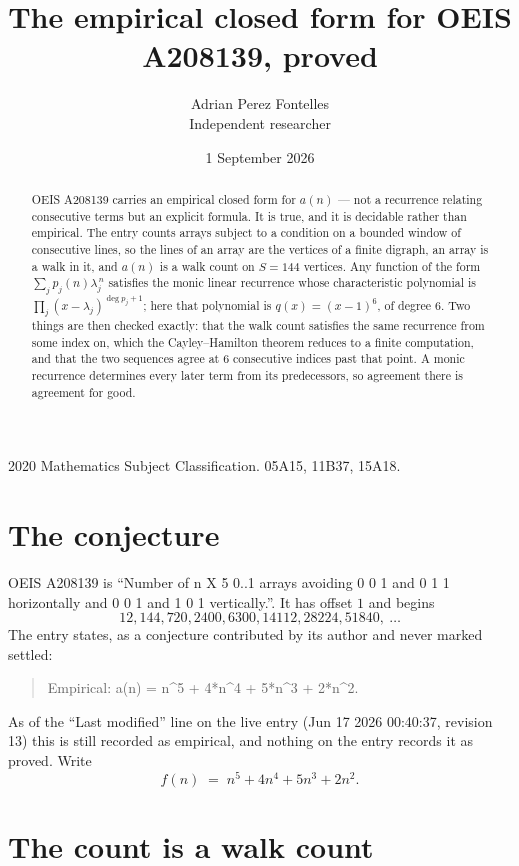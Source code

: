 \documentclass[11pt,a4paper]{article}
\title{The empirical closed form for OEIS A208139, proved}
\author{Adrian Perez Fontelles\\ \small Independent researcher}
\date{1 September 2026}
\theoremstyle{plain}
\theoremstyle{definition}
\begin{document}
\maketitle

\begin{abstract}
OEIS A208139 carries an empirical closed form for $a(n)$ --- not a recurrence relating
consecutive terms but an explicit formula. It is true, and it is decidable rather than
empirical. The entry counts arrays subject to a condition on a bounded window of consecutive lines, so the lines of an array are the
vertices of a finite digraph, an array is a walk in it, and $a(n)$ is a walk count on
$S=144$ vertices. Any function of the form $\sum_j p_j(n)\lambda_j^{\,n}$ satisfies the
monic linear recurrence whose characteristic polynomial is
$\prod_j(x-\lambda_j)^{\deg p_j+1}$; here that polynomial is $q(x)=(x-1)^{6}$, of degree
$6$. Two things are then checked exactly: that the walk count satisfies the same
recurrence from some index on, which the Cayley--Hamilton theorem reduces to a finite
computation, and that the two sequences agree at $6$ consecutive indices past that
point. A monic recurrence determines every later term from its predecessors, so agreement
there is agreement for good.
\end{abstract}

\noindent\small 2020 Mathematics Subject Classification. 05A15, 11B37, 15A18.\normalsize

\section{The conjecture}

OEIS A208139 is ``Number of n X 5 0..1 arrays avoiding 0 0 1 and 0 1 1 horizontally and 0 0 1 and 1 0 1 vertically.''. It has offset $1$ and begins
\[
12, 144, 720, 2400, 6300, 14112, 28224, 51840,\ \dots
\]
The entry states, as a conjecture contributed by its author and never marked settled:
\begin{quote}
Empirical: a(n) = n\^{}5 + 4*n\^{}4 + 5*n\^{}3 + 2*n\^{}2.
\end{quote}
As of the ``Last modified'' line on the live entry (Jun 17 2026 00:40:37, revision 13) this is still
recorded as empirical, and nothing on the entry records it as proved. Write
\[
f(n)\;=\;n^{5} + 4 n^{4} + 5 n^{3} + 2 n^{2}.
\]

\section{The count is a walk count}
\end{document}
